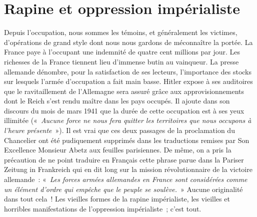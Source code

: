 \documentclass[french,twoside]{book} %
\begin{document}
\section[{Rapine et oppression impérialiste}]{Rapine et oppression impérialiste}
\noindent Depuis l’occupation, nous sommes les témoins, et généralement les victimes, d’opérations de grand style dont nous nous gardons de méconnaître la portée. La France paye à l’occupant une indemnité de quatre cent millions par jour. Les richesses de la France tiennent lieu d’immense butin au vainqueur. La presse allemande dénombre, pour la satisfaction de ses lecteurs, l’importance des stocks sur lesquels l’armée d’occupation a fait main basse. Hitler expose à ses auditoires que le ravitaillement de l’Allemagne sera assuré grâce aux approvisionnements dont le Reich s’est rendu maître dans les pays occupés. Il ajoute dans son discours du mois de mars 1941 que la durée de cette occupation est à ses yeux illimitée (« \emph{Aucune force ne nous fera quitter les territoires que nous occupons à l’heure présente} »). Il est vrai que ces deux passages de la proclamation du Chancelier ont été pudiquement supprimés dans les traductions remises par Son Excellence Monsieur Abetz aux feuilles parisiennes. De même, on a pris la précaution de ne point traduire en Français cette phrase parue dans la Pariser Zeitung in Frankreich qui en dit long sur la mission révolutionnaire de la victoire allemande : « \emph{Les forces armées allemandes en France sont considérées comme un élément d’ordre qui empêche que le peuple se soulève.} » Aucune originalité dans tout cela ! Les vieilles formes de la rapine impérialiste, les vieilles et horribles manifestations de l’oppression impérialiste ; c’est tout.
\end{document}
